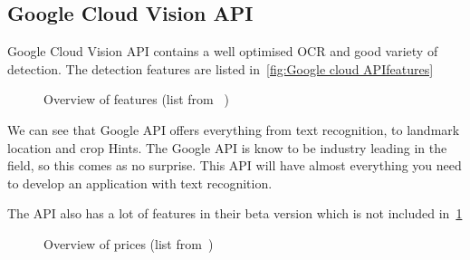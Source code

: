 \subsection{Google Cloud Vision API}\label{subsec:API_Google}

Google Cloud Vision API contains a well optimised OCR and good variety of detection.
The detection features are listed in~\ref{fig:Google cloud APIfeatures}

\begin{figure}[h]
    \caption{Overview of features (list from ~\cite{GoogleCloudPricing})}
    \label{fig:Google cloud API features}
\end{figure}

We can see that Google API offers everything from text recognition, to landmark location and crop Hints.
The Google API is know to be industry leading in the field, so this comes as no surprise.
This API will have almost everything you need to develop an application with text recognition.

The API also has a lot of features in their beta version which is not included in~\ref{fig:Google cloud API features}
\clearpage

\begin{figure}[h]
    \caption{Overview of prices (list from~\cite{GoogleCloudPricing})}
    \label{fig:Google cloud API prices}

\end{figure}

